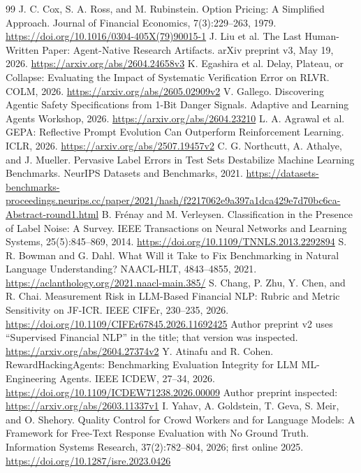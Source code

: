 \begin{thebibliography}{99}
 J. C. Cox, S. A. Ross, and M. Rubinstein. Option Pricing: A Simplified Approach. Journal of Financial Economics, 7(3):229--263, 1979. \url{https://doi.org/10.1016/0304-405X(79)90015-1}
 J. Liu et al. The Last Human-Written Paper: Agent-Native Research Artifacts. arXiv preprint v3, May 19, 2026. \url{https://arxiv.org/abs/2604.24658v3}
 K. Egashira et al. Delay, Plateau, or Collapse: Evaluating the Impact of Systematic Verification Error on RLVR. COLM, 2026. \url{https://arxiv.org/abs/2605.02909v2}
 V. Gallego. Discovering Agentic Safety Specifications from 1-Bit Danger Signals. Adaptive and Learning Agents Workshop, 2026. \url{https://arxiv.org/abs/2604.23210}
 L. A. Agrawal et al. GEPA: Reflective Prompt Evolution Can Outperform Reinforcement Learning. ICLR, 2026. \url{https://arxiv.org/abs/2507.19457v2}
 C. G. Northcutt, A. Athalye, and J. Mueller. Pervasive Label Errors in Test Sets Destabilize Machine Learning Benchmarks. NeurIPS Datasets and Benchmarks, 2021. \url{https://datasets-benchmarks-proceedings.neurips.cc/paper/2021/hash/f2217062e9a397a1dca429e7d70bc6ca-Abstract-round1.html}
 B. Fr\'enay and M. Verleysen. Classification in the Presence of Label Noise: A Survey. IEEE Transactions on Neural Networks and Learning Systems, 25(5):845--869, 2014. \url{https://doi.org/10.1109/TNNLS.2013.2292894}
 S. R. Bowman and G. Dahl. What Will it Take to Fix Benchmarking in Natural Language Understanding? NAACL-HLT, 4843--4855, 2021. \url{https://aclanthology.org/2021.naacl-main.385/}
 S. Chang, P. Zhu, Y. Chen, and R. Chai. Measurement Risk in LLM-Based Financial NLP: Rubric and Metric Sensitivity on JF-ICR. IEEE CIFEr, 230--235, 2026. \url{https://doi.org/10.1109/CIFEr67845.2026.11692425} Author preprint v2 uses ``Supervised Financial NLP'' in the title; that version was inspected. \url{https://arxiv.org/abs/2604.27374v2}
 Y. Atinafu and R. Cohen. RewardHackingAgents: Benchmarking Evaluation Integrity for LLM ML-Engineering Agents. IEEE ICDEW, 27--34, 2026. \url{https://doi.org/10.1109/ICDEW71238.2026.00009} Author preprint inspected: \url{https://arxiv.org/abs/2603.11337v1}
 I. Yahav, A. Goldstein, T. Geva, S. Meir, and O. Shehory. Quality Control for Crowd Workers and for Language Models: A Framework for Free-Text Response Evaluation with No Ground Truth. Information Systems Research, 37(2):782--804, 2026; first online 2025. \url{https://doi.org/10.1287/isre.2023.0426}

\end{thebibliography}
